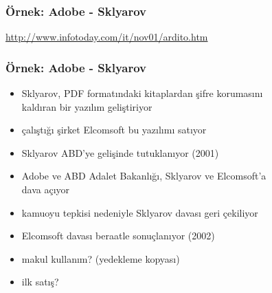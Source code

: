 \documentclass[dvipsnames]{beamer}
\theoremstyle{plain}
\begin{document}
\begin{frame}
  \frametitle{Örnek: Adobe - Sklyarov}

  \begin{center}
  \end{center}

  \medskip
  \tiny{\url{http://www.infotoday.com/it/nov01/ardito.htm}}\\
\end{frame}

\begin{frame}
  \frametitle{Örnek: Adobe - Sklyarov}

  \begin{itemize}
    \item Sklyarov, PDF formatındaki kitaplardan şifre korumasını\\
      kaldıran bir yazılım geliştiriyor
    \item çalıştığı şirket Elcomsoft bu yazılımı satıyor
    \item Sklyarov ABD'ye gelişinde tutuklanıyor (2001)
    \item Adobe ve ABD Adalet Bakanlığı, Sklyarov ve Elcomsoft'a\\
      dava açıyor
    \item kamuoyu tepkisi nedeniyle Sklyarov davası geri çekiliyor
    \item Elcomsoft davası beraatle sonuçlanıyor (2002)

    \pause
    \medskip
    \item makul kullanım? (yedekleme kopyası)
    \item ilk satış?
  \end{itemize}
\end{frame}
\end{document}
